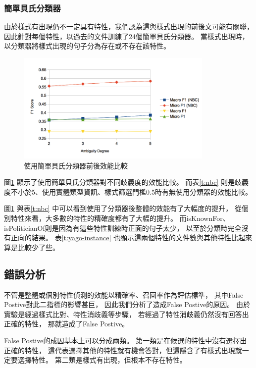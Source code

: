 \subsubsection{簡單貝氏分類器}
由於樣式有出現仍不一定具有特性，我們認為這與樣式出現的前後文可能有關聯，
因此針對每個特性，以過去的文件訓練了24個簡單貝氏分類器。
當樣式出現時，以分類器將樣式出現的句子分為存在或不存在該特性。

\begin{figure}[h]
    \centering
    \includegraphics[width=0.85\textwidth]{images/04-nbc}
    \caption{使用簡單貝氏分類器前後效能比較}
    \label{i:nbc}
\end{figure}



圖\ref{i:nbc} 顯示了使用簡單貝氏分類器對不同歧義度的效能比較。
而表\ref{t:nbc} 則是歧義度不小於5、使用實體類型資訊、樣式篩選門檻0.5時有無使用分類器的效能比較。

圖\ref{i:nbc} 與表\ref{t:nbc} 中可以看到使用了分類器後整體的效能有了大幅度的提升，
從個別特性來看，大多數的特性的精確度都有了大幅的提升。
而isKnownFor、isPoliticianOf則是因為有這些特性訓練時正面的句子太少，
以至於分類時完全沒有正向的結果。
表\ref{t:yago-instance} 也顯示這兩個特性的文件數與其他特性比起來算是比較少了些。

\subsection{錯誤分析}

不管是整體或個別特性偵測的效能以精確率、召回率作為評估標準，
其中False Postive對此二指標的影響甚巨，
因此我們分析了造成False Postive的原因。
由於實驗是經過樣式比對、特性消歧義等步驟，
若經過了特性消歧義仍然沒有回答出正確的特性，
那就造成了False Postive。

False Postive的成因基本上可以分成兩類。
第一類是在候選的特性中沒有選擇出正確的特性，
這代表選擇其他的特性就有機會答對，但這隱含了有樣式出現就一定要選擇特性。
第二類是樣式有出現，但根本不存在特性。

